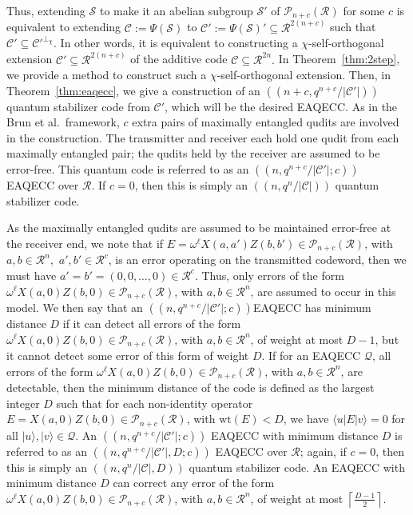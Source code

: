 \documentclass{article}
\theoremstyle{remark}
\theoremstyle{definition}
\numberwithin{equation}{section}
\begin{document}
Thus, extending $\mathcal{S}$ to make it an abelian subgroup $\mathcal{S}'$ of $\mathcal{P}_{n+c}(\mathcal{R})$ for some $c$ is equivalent to extending $\mathcal{C} := \Psi(\mathcal{S})$ to $\mathcal{C}' := \Psi(\mathcal{S})' \subseteq  \mathcal{R}^{2(n+c)}$ such that $\mathcal{C}' \subseteq \mathcal{C}'^{\perp_\chi}.$ In other words, it is equivalent to constructing a $\chi$-self-orthogonal extension $\mathcal{C}' \subseteq  \mathcal{R}^{2(n+c)}$ of the additive code $\mathcal{C} \subseteq \mathcal{R}^{2n}.$ In Theorem~\ref{thm:2step}, we provide a method to construct such a $\chi$-self-orthogonal extension. Then, in Theorem~\ref{thm:eaqecc}, we give a construction of an $((n+c,q^{n+c}/|\mathcal{C'}|))$ quantum stabilizer code from $\mathcal{C}'$, which will be the desired EAQECC. As in the Brun et al.\ framework, $c$ extra pairs of maximally entangled qudits are involved in the construction. The transmitter and receiver each hold one qudit from each maximally entangled pair; the qudits held by the receiver are assumed to be error-free. This quantum code is referred to as an $((n,q^{n+c}/|\mathcal{C'}|;c))$ EAQECC over $\mathcal{R}$. If $c=0$, then this is simply an $((n,q^{n}/|\mathcal{C}|))$ quantum stabilizer code.

As the maximally entangled qudits are assumed to be maintained error-free at the receiver end, we note that if $E=\omega^{\ell} X(a,a')Z(b,b') \in \mathcal{P}_{n+c}(\mathcal{R})$, with $a,b \in \mathcal{R}^{n},$ $a',b' \in \mathcal{R}^{c}$, is an error operating on the transmitted codeword, then we must have $a'=b'=(0,0,\ldots,0)\in \mathcal{R}^{c}.$ Thus, only errors of the form $\omega^{\ell} X(a,0)Z(b,0) \in \mathcal{P}_{n+c}(\mathcal{R})$, with $a,b \in \mathcal{R}^{n}$, are assumed to occur in this model. We then say that an $((n,q^{n+c}/|\mathcal{C}'| ;c))$EAQECC has minimum distance $D$ if it can detect all errors of the form $\omega^{\ell} X(a,0)Z(b,0) \in \mathcal{P}_{n+c}(\mathcal{R})$, with $a,b \in \mathcal{R}^{n}$,  of weight at most $D-1$, but it cannot detect some error of this form of weight $D.$  If for an EAQECC $\mathcal{Q}$, all errors of the form $\omega^{\ell} X(a,0)Z(b,0) \in \mathcal{P}_{n+c}(\mathcal{R})$, with $a,b \in \mathcal{R}^{n}$, are detectable, then the minimum distance of the code is defined as the largest integer $D$ such that for each non-identity operator $E= X(a,0)Z(b,0) \in \mathcal{P}_{n+c}(\mathcal{R})$, with $\text{wt}(E) < D$, we have $\langle u| E | v \rangle=0$ for all $|u \rangle,|v \rangle \in \mathcal{Q}$. An $((n,q^{n+c}/|\mathcal{C}'| ;c))$ EAQECC with minimum distance $D$ is referred to as an $((n,q^{n+c}/|\mathcal{C}'|,D ;c))$ EAQECC over $\mathcal{R}$; again, if $c=0$, then this is simply an $((n,q^{n}/|\mathcal{C}|,D))$ quantum stabilizer code.
 An EAQECC  with minimum distance $D$ can correct any error of the form $\omega^{\ell} X(a,0)Z(b,0) \in \mathcal{P}_{n+c}(\mathcal{R})$,  with $a,b \in \mathcal{R}^{n}$,  of weight at most  $\left\lceil \frac{D-1}{2}\right\rceil.$
\end{document}
